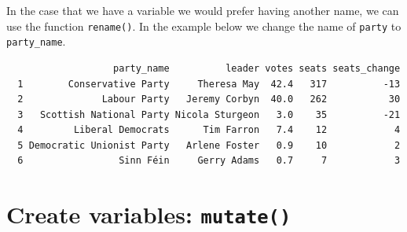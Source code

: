 \documentclass[12pt,oneside]{reedthesis}
\theoremstyle{definition}
\theoremstyle{definition}
\theoremstyle{definition}
\theoremstyle{remark}
\begin{document}
  In the case that we have a variable we would prefer having another name,
  we can use the function \texttt{rename()}. In the example below we
  change the name of \texttt{party} to \texttt{party\_name}.
  \begin{Shaded}
  \begin{Highlighting}[]
  \end{Highlighting}
  \end{Shaded}
  \begin{verbatim}
                   party_name          leader votes seats seats_change
  1        Conservative Party     Theresa May  42.4   317          -13
  2              Labour Party   Jeremy Corbyn  40.0   262           30
  3   Scottish National Party Nicola Sturgeon   3.0    35          -21
  4         Liberal Democrats      Tim Farron   7.4    12            4
  5 Democratic Unionist Party   Arlene Foster   0.9    10            2
  6                 Sinn Féin     Gerry Adams   0.7     7            3
  \end{verbatim}
  \section{\texorpdfstring{Create variables:
  \texttt{mutate()}}{Create variables: mutate()}}\label{create-variables-mutate}
  
\end{document}
